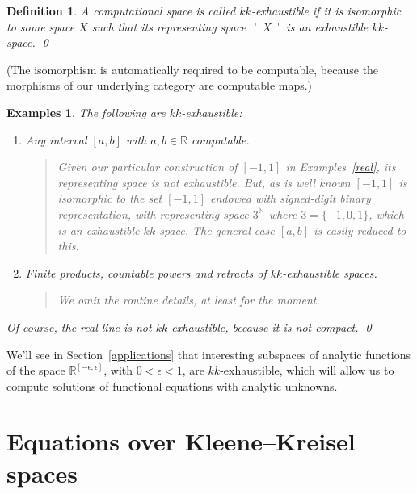 \documentclass[10pt]{article}
\newcommand{\godel}[1]{\ulcorner #1 \urcorner}
\newtheorem{Def}[cor]{Definition}
\newtheorem{Examples}[cor]{Examples}
\newenvironment{definition}{\begin{Def}\em}{\end{Def}}
\newenvironment{examples}{\begin{Examples}\em}{\end{Examples}}
\newcommand{\N}{\mathbb{N}}
\newcommand{\R}{\mathbb{R}}
\begin{document}
\begin{definition} \label{kk:exhaustible} A computational space is
  called \emph{$kk$-exhaustible} if it is isomorphic to some space $X$
  such that its representing space~$\godel{X}$ is an exhaustible
  $kk$-space.  \qed
\end{definition}
\noindent
(The isomorphism is automatically required to be computable,
because the morphisms of our underlying category are computable maps.)
\begin{examples} \label{kk:examples} The following are $kk$-exhaustible:
  \begin{enumerate}
  \item \emph{Any interval $[a,b]$ with $a,b \in\R$ computable.}
    \begin{quote}
      Given our particular construction of $[-1,1]$ in
      Examples~\ref{real}, its representing space is not exhaustible.
      But, as is well known $[-1,1]$ is isomorphic to the set $[-1,1]$
      endowed with signed-digit binary representation, with
      representing space $3^\N$ where $3=\{-1,0,1\}$, which is an
      exhaustible $kk$-space. The general case $[a,b]$ is easily reduced to this.
    \end{quote}

  \item \emph{Finite products, countable powers and retracts of $kk$-exhaustible spaces.}

    \begin{quote}
      We omit the routine details, at least for the moment. 
    \end{quote}
  \end{enumerate}
Of course, the real line is not $kk$-exhaustible, because it is not compact. \qed
\end{examples}
\noindent
We'll see in Section~\ref{applications} that interesting subspaces of
analytic functions of the space $\R^{[-\epsilon,\epsilon]}$, with $0 <
\epsilon < 1$, are $kk$-exhaustible, which will allow us to compute
solutions of functional equations with analytic unknowns.


\section{Equations over Kleene--Kreisel spaces}
\label{equations} \label{proceed}
\end{document}
